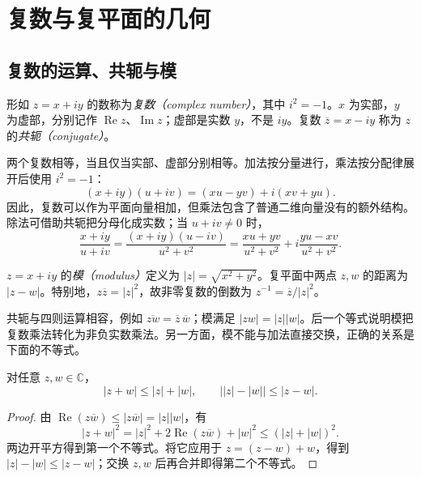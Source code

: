 \setcounter{chapter}{1} %
\chapter{复数与复平面的几何}
\label{chap:ca-plane}

\section{复数的运算、共轭与模}

\begin{definition}[复数与共轭]
形如 $z=x+iy$ 的数称为\emph{复数（complex number）}，其中 $i^2=-1$。$x$ 为实部，$y$ 为虚部，分别记作 $\operatorname{Re}z$、$\operatorname{Im}z$；虚部是实数 $y$，不是 $iy$。复数 $\overline z=x-iy$ 称为 $z$ 的\emph{共轭（conjugate）}。
\end{definition}

两个复数相等，当且仅当实部、虚部分别相等。加法按分量进行，乘法按分配律展开后使用 $i^2=-1$：
\[
 (x+iy)(u+iv)=(xu-yv)+i(xv+yu).
\]
因此，复数可以作为平面向量相加，但乘法包含了普通二维向量没有的额外结构。除法可借助共轭把分母化成实数；当 $u+iv\ne0$ 时，
\[
 \frac{x+iy}{u+iv}
 =\frac{(x+iy)(u-iv)}{u^2+v^2}
 =\frac{xu+yv}{u^2+v^2}+i\frac{yu-xv}{u^2+v^2}.
\]

\begin{definition}[模与距离]
$z=x+iy$ 的\emph{模（modulus）}定义为 $|z|=\sqrt{x^2+y^2}$。复平面中两点 $z,w$ 的距离为 $|z-w|$。特别地，$z\overline z=|z|^2$，故非零复数的倒数为 $z^{-1}=\overline z/|z|^2$。
\end{definition}

共轭与四则运算相容，例如 $\overline{zw}=\overline z\,\overline w$；模满足 $|zw|=|z||w|$。后一个等式说明模把复数乘法转化为非负实数乘法。另一方面，模不能与加法直接交换，正确的关系是下面的不等式。

\begin{proposition}[三角不等式]
对任意 $z,w\in\mathbb C$，
\begin{equation}
 |z+w|\le |z|+|w|,\qquad
 \bigl||z|-|w|\bigr|\le |z-w|.
 \label{eq:ca-triangle}
\end{equation}
\end{proposition}
\begin{proof}
由 $\operatorname{Re}(z\overline w)\le|z\overline w|=|z||w|$，有
\[
 |z+w|^2=|z|^2+2\operatorname{Re}(z\overline w)+|w|^2
 \le(|z|+|w|)^2.
\]
两边开平方得到第一个不等式。将它应用于 $z=(z-w)+w$，得到 $|z|-|w|\le|z-w|$；交换 $z,w$ 后再合并即得第二个不等式。
\end{proof}

